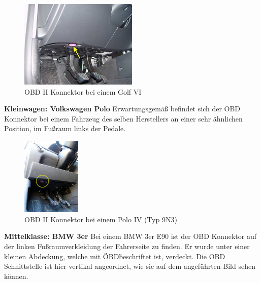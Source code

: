 \begin{figure}[!htb]\centering
	\includegraphics[width=0.5\textwidth]{images/golfobd}
	\caption{OBD II Konnektor bei einem Golf VI \cite{SIMR.CH2-obd2.GolfOBD}}\label{Fig:Data3}
\end{figure}

\textbf{Kleinwagen: Volkswagen Polo}
Erwartungsgemäß befindet sich der OBD Konnektor bei einem Fahrzeug des selben Herstellers an einer sehr ähnlichen Position, im Fußraum links der Pedale.

\begin{figure}[!htb]\centering
	\includegraphics[width=0.25\textwidth]{images/poloobd}
	\caption{OBD II Konnektor bei einem Polo IV (Typ 9N3) \cite{SIMR.CH2-obd2.PoloOBD}}\label{Fig:Data3}
\end{figure}

\textbf{Mittelklasse: BMW 3er}
Bei einem BMW 3er E90 ist der OBD Konnektor auf der linken Fußraumverkleidung der Fahrerseite zu finden. Er wurde unter einer kleinen Abdeckung, welche mit \"OBD\" beschriftet ist, verdeckt. Die OBD Schnittstelle ist hier vertikal angeordnet, wie sie auf dem angeführten Bild sehen können.

